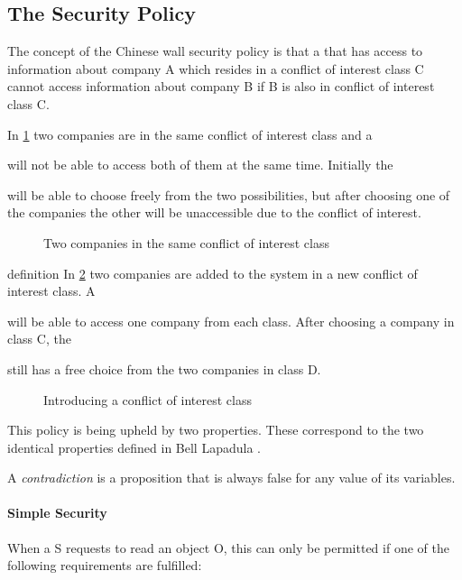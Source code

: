 \subsection{The Security Policy}
The concept of the Chinese wall security policy is that a \principal{} that has access to information about company A which resides in a conflict of interest class C cannot access information about company B if B is also in conflict of interest class C.

In \cref{china:conflict} two companies are in the same conflict of interest class and a \subject{} will not be able to access both of them at the same time.
Initially the \subject{} will be able to choose freely from the two possibilities, but after choosing one of the companies the other will be unaccessible due to the conflict of interest.

\begin{figure}[h]
  \centering
\resizebox{0.3\textwidth}{!}{  
  
  }
  \caption{Two companies in the same conflict of interest class}
  \label{china:conflict}
\end{figure}
definition
In \cref{china:conflict2} two companies are added to the system in a new conflict of interest class.
A \subject{} will be able to access one company from each class.
After choosing a company in class C, the \subject{} still has a free choice from the two companies in class D.

\begin{figure}[h]
  \centering
  \resizebox{0.8\textwidth}{!}{
    
    }
  \caption{Introducing a conflict of interest class}
  \label{china:conflict2}
\end{figure}
This policy is being upheld by two properties.
These correspond to the two identical properties defined in Bell Lapadula .

\begin{definition}\label{def:contradiction}
A \emph{contradiction} is a proposition that is always false for any value of its variables.
\end{definition}
\paragraph{Simple Security}

When a \principal{} S requests to read an object O, this can only be permitted if one of the following requirements are fulfilled:

